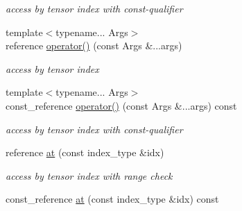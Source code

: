 \begin{DoxyCompactItemize}
\begin{DoxyCompactList}\small\item\em access by tensor index with const-\/qualifier \item\end{DoxyCompactList}\item 
\hypertarget{classbtas_1_1_tensor_3_01_t_00_010ul_00_01_order_01_4_a25e3b31a11f298ca914e5bd69506f687}{
{\footnotesize template$<$typename... Args$>$ }\\reference \hyperlink{classbtas_1_1_tensor_3_01_t_00_010ul_00_01_order_01_4_a25e3b31a11f298ca914e5bd69506f687}{operator()} (const Args \&...args)}
\label{classbtas_1_1_tensor_3_01_t_00_010ul_00_01_order_01_4_a25e3b31a11f298ca914e5bd69506f687}

\begin{DoxyCompactList}\small\item\em access by tensor index \item\end{DoxyCompactList}\item 
\hypertarget{classbtas_1_1_tensor_3_01_t_00_010ul_00_01_order_01_4_ade8335ab39bc5524b63683bcb302c232}{
{\footnotesize template$<$typename... Args$>$ }\\const\_\-reference \hyperlink{classbtas_1_1_tensor_3_01_t_00_010ul_00_01_order_01_4_ade8335ab39bc5524b63683bcb302c232}{operator()} (const Args \&...args) const }
\label{classbtas_1_1_tensor_3_01_t_00_010ul_00_01_order_01_4_ade8335ab39bc5524b63683bcb302c232}

\begin{DoxyCompactList}\small\item\em access by tensor index with const-\/qualifier \item\end{DoxyCompactList}\item 
\hypertarget{classbtas_1_1_tensor_3_01_t_00_010ul_00_01_order_01_4_a224dedee438c7c58cd20978f6db61c41}{
reference \hyperlink{classbtas_1_1_tensor_3_01_t_00_010ul_00_01_order_01_4_a224dedee438c7c58cd20978f6db61c41}{at} (const index\_\-type \&idx)}
\label{classbtas_1_1_tensor_3_01_t_00_010ul_00_01_order_01_4_a224dedee438c7c58cd20978f6db61c41}

\begin{DoxyCompactList}\small\item\em access by tensor index with range check \item\end{DoxyCompactList}\item 
\hypertarget{classbtas_1_1_tensor_3_01_t_00_010ul_00_01_order_01_4_af4576c3b5824ffdce0ab17f68e137aa5}{
const\_\-reference \hyperlink{classbtas_1_1_tensor_3_01_t_00_010ul_00_01_order_01_4_af4576c3b5824ffdce0ab17f68e137aa5}{at} (const index\_\-type \&idx) const }
\label{classbtas_1_1_tensor_3_01_t_00_010ul_00_01_order_01_4_af4576c3b5824ffdce0ab17f68e137aa5}


\end{DoxyCompactItemize}
